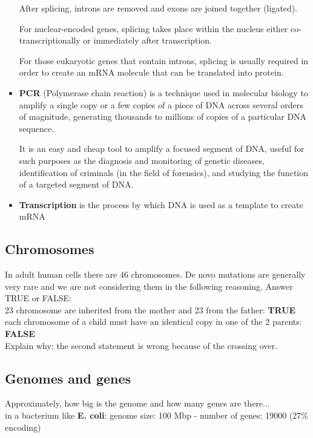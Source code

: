 \begin{itemize}
After splicing, introns are removed and exons are joined together (ligated).

For nuclear-encoded genes, splicing takes place within the nucleus either
co-transcriptionally or immediately after transcription.

For those eukaryotic genes that contain introns, splicing is usually required
in order to create an mRNA molecule that can be translated into protein.
	\item \textbf{PCR} (Polymerase chain reaction) is a technique used in
molecular biology to amplify a single copy or a few copies of a piece of DNA
across several orders of magnitude, generating thousands to millions of copies
of a particular DNA sequence.

It is an easy and cheap tool to amplify a focused segment of DNA, useful for
such purposes as the diagnosis and monitoring of genetic diseases,
identification of criminals (in the field of forensics), and studying the
function of a targeted segment of DNA.
	\item \textbf{Transcription} is the process by which DNA is used as a
template to create mRNA
\end{itemize}

\subsection{Chromosomes}

In adult human cells there are 46 chromosomes. De novo mutations are generally
very rare and we are not considering them in the following reasoning.
Answer TRUE or FALSE: \\

23 chromosome are inherited from the mother and 23 from the father:
\textbf{TRUE} \\

each chromosome of a child must have an identical copy in one of the 2 parents:
\textbf{FALSE} \\

Explain why: the second statement is wrong because of the crossing over.

\subsection{Genomes and genes}

Approximately, how big is the genome and how many genes are there...\\

in a bacterium like \textbf{E. coli}: genome size: 100 Mbp - number of genes:
19000 (27\% encoding)


